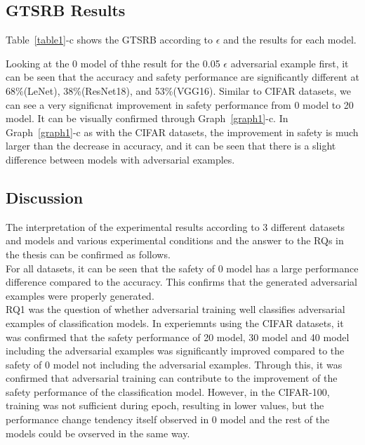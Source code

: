 \documentclass[journal,article,submit,moreauthors,pdftex]{Definitions/mdpi}
\begin{document}
\subsection{GTSRB Results}

Table~\ref{table1}-c shows the GTSRB according to \begin{math}\epsilon\end{math} and the results for each model.

Looking at the 0 model of thhe result for the 0.05 \begin{math}\epsilon\end{math} adversarial example first, it can be seen that the accuracy and safety performance are significantly different at 68\%(LeNet), 38\%(ResNet18), and 53\%(VGG16).
Similar to CIFAR datasets, we can see a very significnat improvement in safety performance from 0 model to 20 model.
It can be visually confirmed through Graph~\ref{graph1}-c.
In Graph~\ref{graph1}-c as with the CIFAR datasets, the improvement in safety is much larger than the decrease in accuracy, and it can be seen that there is a slight difference between models with adversarial examples.

\subsection{Discussion}

The interpretation of the experimental results according to 3 different datasets and models and various experimental conditions and the answer to the RQs in the thesis can be confirmed as follows. \\

For all datasets, it can be seen that the safety of 0 model has a large performance difference compared to the accuracy. This confirms that the generated adversarial examples were properly generated. \\

RQ1 was the question of whether adversarial training well classifies adversarial examples of classification models.
In experiemnts using the CIFAR datasets, it was confirmed that the safety performance of 20 model, 30 model and 40 model including the adversarial examples was significantly improved compared to the safety of 0 model not including the adversarial examples.
Through this, it was confirmed that adversarial training can contribute to the improvement of the safety performance of the classification model.
However, in the CIFAR-100, training was not sufficient during epoch, resulting in lower values, but the performance change tendency itself observed in 0 model and the rest of the models could be ovserved in the same way.
\end{document}
